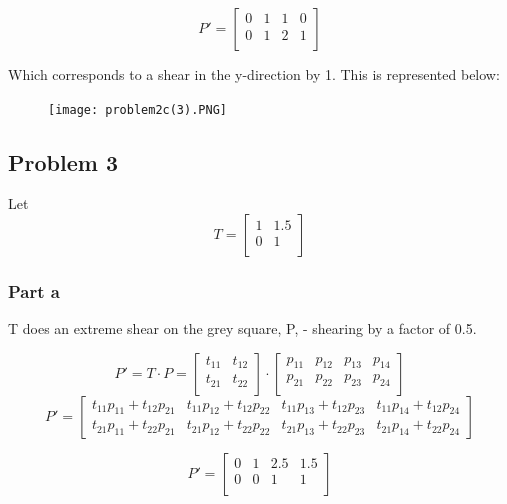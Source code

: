 \documentclass{article}
\begin{document}
\[P' = 
\begin{bmatrix}
    0 & 1 & 1 & 0 \\
    0 & 1 & 2 & 1 \\
\end{bmatrix}
\]

Which corresponds to a shear in the y-direction by 1. This is represented below:

\begin{figure}[!htb]
  \centering
  \texttt{[image: problem2c(3).PNG]}
  \label{fig3}
\end{figure}


\subsection*{Problem 3}

Let \[T = 
\begin{bmatrix}
    1 & 1.5  \\
    0 & 1  \\
\end{bmatrix}
\]

\subsubsection*{Part a}

T does an extreme shear on the grey square, P,  - shearing by a factor of 0.5.

\[ 
P' = T \cdot P = \begin{bmatrix}
t_{11} & t_{12} \\
t_{21} & t_{22} \\
\end{bmatrix} \cdot \begin{bmatrix}
p_{11} & p_{12} & p_{13} & p_{14} \\
p_{21} & p_{22} & p_{23} & p_{24} \\
\end{bmatrix}
\]
\[P' =  
\begin{bmatrix}
    t_{11}p_{11} + t_{12}p_{21} & t_{11}p_{12} + t_{12}p_{22} & t_{11}p_{13} + t_{12}p_{23} & t_{11}p_{14} + t_{12}p_{24} \\
    t_{21}p_{11} + t_{22}p_{21} & t_{21}p_{12} + t_{22}p_{22} & t_{21}p_{13} + t_{22}p_{23} & t_{21}p_{14} + t_{22}p_{24}
\end{bmatrix}
\]

\[P' = 
\begin{bmatrix}
    0 & 1 & 2.5 & 1.5 \\
    0 & 0 & 1 & 1 \\
\end{bmatrix}
\]
\end{document}
